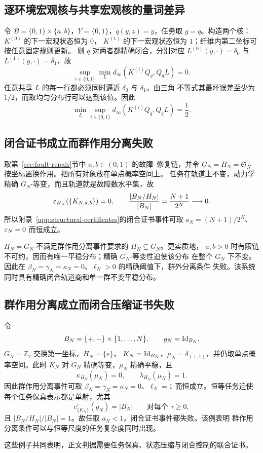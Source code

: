 \subsection{逐环境宏观核与共享宏观核的量词差异}

\begin{counterexample}[两个量词次序]
\label{counter:environment-specific-versus-shared}
令 $B=\{0,1\}\times\{a,b\}$，$Y=\{0,1\}$，$q(y,z)=y$，任务取
$g=q$。构造两个核：$K^{(0)}$ 的下一宏观状态恒为 $0$，
$K^{(1)}$ 的下一宏观状态恒为 $1$；纤维内第二坐标可按任意固定规则更新。
则 $q$ 对两者都精确闭合，分别对应
$L^{(0)}(y,\cdot)=\delta_0$ 与 $L^{(1)}(y,\cdot)=\delta_1$，故
\[
\sup_{i\in\{0,1\}}\min_L
d_\infty(K^{(i)}Q_q,Q_qL)=0.
\]
任意共享 $L$ 的每一行都必须同时逼近 $\delta_0$ 与 $\delta_1$。由三角
不等式其最坏误差至少为 $1/2$，而取均匀分布行可以达到该值。因此
\[
\min_L\sup_{i\in\{0,1\}}
d_\infty(K^{(i)}Q_q,Q_qL)=\frac12.
\]
\end{counterexample}

\subsection{闭合证书成立而群作用分离失败}

\begin{counterexample}[精确轨道压缩与单一群不变分布]
\label{counter:certificate-without-separation}
取第~\ref{sec:fault-repair}节中 $a,b\in(0,1)$ 的故障--修复链，并令
$G_N=H_N=\mathfrak S_N$ 按坐标置换作用。把所有对象放在单点概率空间上。
任务在轨道上不变，动力学精确 $G_N$-等变，而且轨道就是故障数水平集，故
\[
\varepsilon_{H_N}(\{K_{N,a,b}\})=0,
\qquad
\frac{|B_N/H_N|}{|B_N|}=\frac{N+1}{2^N}\longrightarrow0.
\]
所以附录~\ref{app:structural-certificates}的闭合证书事件可取
$a_N=(N+1)/2^N$、$\varepsilon_N=0$ 而恒成立。

$H_N=G_N$ 不满足群作用分离事件要求的 $H_N\subsetneq G_N$。更实质地，
$a,b>0$ 时有限链不可约，因而有唯一平稳分布；精确 $G_N$-等变性迫使该分布
在整个 $G_N$ 下不变。因此在
$\beta_N=\gamma_N=\kappa_N=0$、$\ell_N>0$ 的精确阈值下，群外分离条件
失败。该系统同时具有精确闭合轨道商和单一群不变平稳分布。
\end{counterexample}

\subsection{群作用分离成立而闭合压缩证书失败}

\begin{counterexample}[精确群作用分离与恒等任务]
\label{counter:separation-without-certificate}
令
\[
B_N=\{+,-\}\times\{1,\ldots,N\},
\qquad
g_N=\operatorname{Id}_{B_N},
\]
$G_N=\mathbb Z_2$ 交换第一坐标，$H_N=\{e\}$，
$K_N=\operatorname{Id}_{B_N}$，$\mu_N=\delta_{(+,1)}$，并仍取单点概率空间。此时
$K_N$ 对 $G_N$ 精确等变，$\mu_N$ 精确平稳，且
\[
\kappa_{H_N}(\mu_N)=0,
\qquad
\lambda_{H_N}(\mu_N)=1.
\]
因此群作用分离事件可取
$\beta_N=\gamma_N=\kappa_N=0$、$\ell_N=1$ 而恒成立。恒等任务迫使
每个任务保真表示都是单射，尤其
\[
c_{\{K_N\}}^\tau(g_N)=|B_N|
\qquad\text{对每个 }\tau\ge0,
\]
且 $|B_N/H_N|/|B_N|=1$。故任取 $a_N<1$，闭合证书事件都失败。该例表明
群作用分离条件可以与恒等尺度的任务复杂度同时出现。
\end{counterexample}

这些例子共同表明，正文判据需要任务保真、状态压缩与闭合控制的联合证书。
